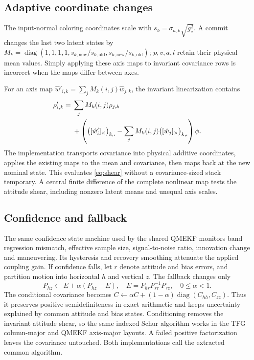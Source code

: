 \documentclass[conference]{IEEEtran}
\DeclareMathOperator{\diag}{diag}\DeclareMathOperator{\Rea}{Re}\DeclareMathOperator{\Ima}{Im}
\begin{document}
\subsection{Adaptive coordinate changes}
The input-normal coloring coordinates scale with
$s_k=\sigma_{a,k}\sqrt{g_c^2}$. A commit changes the last two latent states by
$M_k=\diag(1,1,1,1,s_{k,\mathrm{new}}/s_{k,\mathrm{old}},
s_{k,\mathrm{new}}/s_{k,\mathrm{old}})$; $p,v,a,l$ retain their physical
mean values. Simply applying these axis maps to invariant covariance rows is
incorrect when the maps differ between axes.

For an axis map $\hat w'_{i,k}=\sum_jM_k(i,j)\hat w_{j,k}$,
the invariant linearization contains
\begin{equation}
 \begin{split}
 \rho'_{i,k}={}&\sum_jM_k(i,j)\rho_{j,k}\\
 &+\left(\bigl([\hat w'_i]_\times\bigr)_{k,:}
 -\sum_jM_k(i,j)\bigl([\hat w_j]_\times\bigr)_{k,:}\right)\phi .
 \end{split}
 \label{eq:shear}
\end{equation}
The implementation transports covariance into physical additive coordinates,
applies the existing maps to the mean and covariance, then maps back at the
new nominal state. This evaluates \cref{eq:shear} without a covariance-sized
stack temporary. A central finite difference of the complete nonlinear map
tests the attitude shear, including nonzero latent means and unequal axis scales.

\subsection{Confidence and fallback}
The same confidence state machine used by the shared QMEKF monitors band
regression mismatch, effective sample size, signal-to-noise ratio, innovation
change and maneuvering. Its hysteresis and recovery smoothing attenuate the
applied coupling gain. If confidence falls, let $r$ denote attitude and bias
errors, and partition motion into horizontal $h$ and vertical $z$. The fallback
changes only
\begin{equation}
 P_{hz}\leftarrow E+\alpha(P_{hz}-E),\quad
 E=P_{hr}P_{rr}^{-1}P_{rz},\quad 0\leq\alpha<1.
\end{equation}
The conditional covariance becomes
$C\leftarrow\alpha C+(1-\alpha)\diag(C_{hh},C_{zz})$.
Thus it preserves positive semidefiniteness in exact arithmetic and keeps
uncertainty explained by common attitude and bias states. Conditioning removes
the invariant attitude shear, so the same indexed Schur algorithm works in the
TFG column-major and QMEKF axis-major layouts. A failed positive factorization
leaves the covariance untouched. Both implementations call the extracted common
algorithm.
\end{document}
